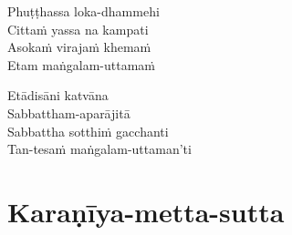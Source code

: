 \begin{paritta}
Phuṭṭhassa loka-dhammehi\\
Cittaṁ yassa na kampati\\
Asokaṁ virajaṁ khemaṁ\\
Etam maṅgalam-uttamaṁ

Etādisāni katvāna\\
Sabbattham-aparājitā\\
Sabbattha sotthiṁ gacchanti\\
Tan-tesaṁ maṅgalam-uttaman'ti


\end{paritta}

\clearpage

\chapter{Karaṇīya-metta-sutta}%


